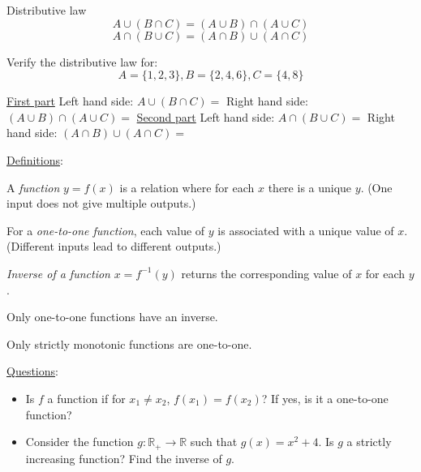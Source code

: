 \documentclass{./../../latex/handout}
\begin{document}
\thispagestyle{plain}
\newcommand{\mytitle}{Sets and Functions}
\myheader{\mytitle}

\vspace{0.5em}
Distributive law
$$ A \cup (B \cap C) = (A \cup B) \cap (A \cup C) $$
$$ A \cap (B \cup C) = (A \cap B) \cup (A \cap C) $$

\vspace{1em}

Verify the distributive law for:
$$ A = \{1,2,3\}, B = \{2,4,6\}, C=\{4,8\} $$

\underline{First part} \vspace{1em}
Left hand side: $ A \cup (B \cap C) = $  \vspace{1em}
\vspace{1em}
Right hand side: $ (A \cup B) \cap (A \cup C) = $ \vspace{1em}
\vspace{1em}
\underline{Second part} \vspace{1em}
Left hand side: $ A \cap (B \cup C) = $  \vspace{1em}
\vspace{1em}
Right hand side: $ (A \cap B) \cup (A \cap C) = $ \vspace{1em}

\newpage
\underline{Definitions}:
\begin{witemize}
	\item A \textit{function} $y=f(x)$ is a relation where for each $x$ there is a unique $y$. (One input does not give multiple outputs.)
	\item For a \textit{one-to-one function}, each value of $y$ is associated with a unique value of $x$. (Different inputs lead to different outputs.)
	\item \textit{Inverse of a function} $x=f^{-1}(y)$ returns the corresponding value of $x$ for each $y$. 
	\item Only one-to-one functions have an inverse.
	\item Only strictly monotonic functions are one-to-one.
\end{witemize}
\vspace{1cm}
\underline{Questions}:
\begin{itemize}
	\item Is $f$ a function if for $ x_1 \neq x_2 $, $f(x_1) = f(x_2)$? If yes, is it a one-to-one function? \\ \vspace{3cm}
	\item Consider the function $g: \mathbb{R}_{+} \rightarrow \mathbb{R}$ such that $g(x) = x^2 + 4 $. Is $g$ a strictly increasing function? Find the inverse of $g$. 
\end{itemize}
\end{document}
